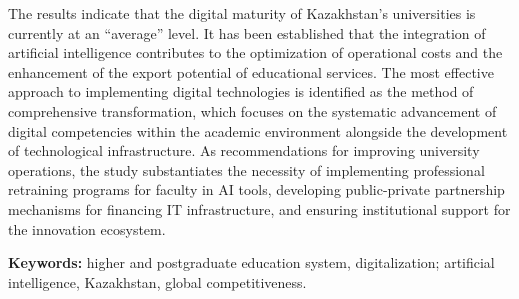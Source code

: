 The results indicate that the digital maturity of Kazakhstan's
universities is currently at an ``average'' level. It has been
established that the integration of artificial intelligence contributes
to the optimization of operational costs and the enhancement of the
export potential of educational services. The most effective approach to
implementing digital technologies is identified as the method of
comprehensive transformation, which focuses on the systematic
advancement of digital competencies within the academic environment
alongside the development of technological infrastructure. As
recommendations for improving university operations, the study
substantiates the necessity of implementing professional retraining
programs for faculty in AI tools, developing public-private partnership
mechanisms for financing IT infrastructure, and ensuring institutional
support for the innovation ecosystem.

{\bfseries Keywords:} higher and postgraduate education system,
digitalization; artificial intelligence, Kazakhstan, global
competitiveness.

